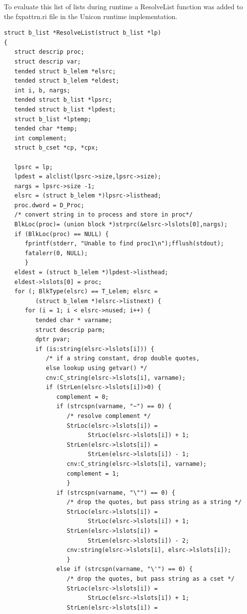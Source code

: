 \documentclass{article}
\begin{document}
To evaluate this list of lists during runtime a ResolveList function was added to the fxpattrn.ri file in the Unicon runtime implementation.  
\begin{verbatim}
struct b_list *ResolveList(struct b_list *lp)
{
   struct descrip proc;
   struct descrip var;
   tended struct b_lelem *elsrc;
   tended struct b_lelem *eldest;
   int i, b, nargs;
   tended struct b_list *lpsrc;
   tended struct b_list *lpdest;
   struct b_list *lptemp;
   tended char *temp;
   int complement;
   struct b_cset *cp, *cpx;

   lpsrc = lp;
   lpdest = alclist(lpsrc->size,lpsrc->size);
   nargs = lpsrc->size -1;
   elsrc = (struct b_lelem *)lpsrc->listhead;
   proc.dword = D_Proc;
   /* convert string in to process and store in proc*/
   BlkLoc(proc)= (union block *)strprc(&elsrc->lslots[0],nargs);
   if (BlkLoc(proc) == NULL) {
      fprintf(stderr, "Unable to find proc1\n");fflush(stdout);
      fatalerr(0, NULL);
      }
   eldest = (struct b_lelem *)lpdest->listhead;
   eldest->lslots[0] = proc;
   for (; BlkType(elsrc) == T_Lelem; elsrc = 
         (struct b_lelem *)elsrc->listnext) {
      for (i = 1; i < elsrc->nused; i++) {
         tended char * varname;
         struct descrip parm;
         dptr pvar;
         if (is:string(elsrc->lslots[i])) {
            /* if a string constant, drop double quotes,
            else lookup using getvar() */
            cnv:C_string(elsrc->lslots[i], varname);
            if (StrLen(elsrc->lslots[i])>0) {
               complement = 0;
               if (strcspn(varname, "~") == 0) {
                  /* resolve complement */
                  StrLoc(elsrc->lslots[i]) = 
                        StrLoc(elsrc->lslots[i]) + 1;
                  StrLen(elsrc->lslots[i]) = 
                        StrLen(elsrc->lslots[i]) - 1;
                  cnv:C_string(elsrc->lslots[i], varname);
                  complement = 1;
                  }
               if (strcspn(varname, "\"") == 0) {
                  /* drop the quotes, but pass string as a string */
                  StrLoc(elsrc->lslots[i]) = 
                        StrLoc(elsrc->lslots[i]) + 1;
                  StrLen(elsrc->lslots[i]) = 
                        StrLen(elsrc->lslots[i]) - 2;
                  cnv:string(elsrc->lslots[i], elsrc->lslots[i]);
                  }
               else if (strcspn(varname, "\'") == 0) { 
                  /* drop the quotes, but pass string as a cset */
                  StrLoc(elsrc->lslots[i]) = 
                        StrLoc(elsrc->lslots[i]) + 1;
                  StrLen(elsrc->lslots[i]) = 

\end{verbatim}
\end{document}
